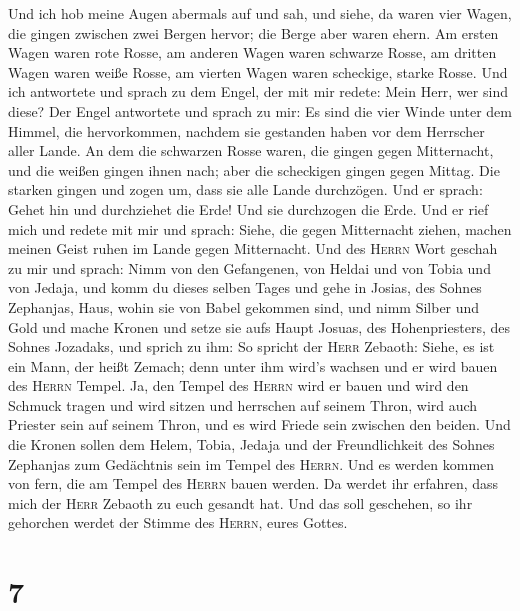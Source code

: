  Und ich hob meine Augen abermals auf und sah, und siehe,
da waren vier Wagen, die gingen zwischen zwei Bergen hervor; die Berge
aber waren ehern.  Am ersten Wagen waren rote Rosse, am
anderen Wagen waren schwarze Rosse,  am dritten Wagen
waren weiße Rosse, am vierten Wagen waren scheckige, starke Rosse.
 Und ich antwortete und sprach zu dem Engel, der mit mir
redete: Mein Herr, wer sind diese?  Der Engel antwortete
und sprach zu mir: Es sind die vier Winde unter dem Himmel, die
hervorkommen, nachdem sie gestanden haben vor dem Herrscher aller Lande.
 An dem die schwarzen Rosse waren, die gingen gegen
Mitternacht, und die weißen gingen ihnen nach; aber die scheckigen
gingen gegen Mittag.  Die starken gingen und zogen um,
dass sie alle Lande durchzögen. Und er sprach: Gehet hin und durchziehet
die Erde! Und sie durchzogen die Erde.  Und er rief mich
und redete mit mir und sprach: Siehe, die gegen Mitternacht ziehen,
machen meinen Geist ruhen im Lande gegen Mitternacht.  Und
des \textsc{Herrn} Wort geschah zu mir und sprach:  Nimm
von den Gefangenen, von Heldai und von Tobia und von Jedaja, und komm du
dieses selben Tages und gehe in Josias, des Sohnes Zephanjas, Haus,
wohin sie von Babel gekommen sind,  und nimm Silber und
Gold und mache Kronen und setze sie aufs Haupt Josuas, des
Hohenpriesters, des Sohnes Jozadaks,  und sprich zu ihm:
So spricht der \textsc{Herr} Zebaoth: Siehe, es ist ein Mann, der heißt
Zemach; denn unter ihm wird's wachsen und er wird bauen des
\textsc{Herrn} Tempel.  Ja, den Tempel des \textsc{Herrn}
wird er bauen und wird den Schmuck tragen und wird sitzen und herrschen
auf seinem Thron, wird auch Priester sein auf seinem Thron, und es wird
Friede sein zwischen den beiden.  Und die Kronen sollen
dem Helem, Tobia, Jedaja und der Freundlichkeit des Sohnes Zephanjas zum
Gedächtnis sein im Tempel des \textsc{Herrn}.  Und es
werden kommen von fern, die am Tempel des \textsc{Herrn} bauen werden.
Da werdet ihr erfahren, dass mich der \textsc{Herr} Zebaoth zu euch
gesandt hat. Und das soll geschehen, so ihr gehorchen werdet der Stimme
des \textsc{Herrn}, eures Gottes.

\hypertarget{section-6}{%
\section{7}\label{section-6}}

